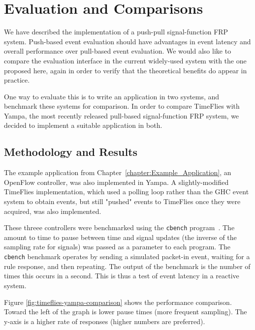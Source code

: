 \chapter{Evaluation and Comparisons}
\label{chapter:Evaluation_and_Comparisons}

We have described the implementation of a push-pull signal-function FRP system.
Push-based event evaluation should have advantages in event latency and overall
performance over pull-based event evaluation. We would also like to compare
the evaluation interface in the current widely-used system with the one proposed
here, again in order to verify that the theoretical benefits do appear in
practice.

One way to evaluate this is to write an application in two systems, and benchmark
these systems for comparison. In order to compare TimeFlies with Yampa, the most
recently released pull-based signal-function FRP system, we decided to implement
a suitable application in both.

\section{Methodology and Results}
\label{section:Evaluation_and_Comparisons-Methodology_and_Results}

The example application from Chapter~\ref{chapter:Example_Application}, an
OpenFlow controller, was also implemented in Yampa. A slightly-modified
TimeFlies implementation, which used a polling loop rather than the GHC event
system to obtain events, but still "pushed" events to TimeFlies once they were
acquired, was also implemented.

These threee controllers were benchmarked using the {\tt cbench}
program~\cite{cbench}. The amount to time to pause between time and signal
updates (the inverse of the sampling rate for signals) was passed as a parameter
to each program. The {\tt cbench} benchmark operates by sending a simulated
packet-in event, waiting for a rule response, and then repeating. The output of
the benchmark is the number of times this occurs in a second. This is thus a
test of event latency in a reactive system.

Figure \ref{fig:timeflies-yampa-comparison} shows the performance comparison.
Toward the left of the graph is lower pause times (more frequent sampling). The
y-axis is a higher rate of responses (higher numbers are preferred). 

